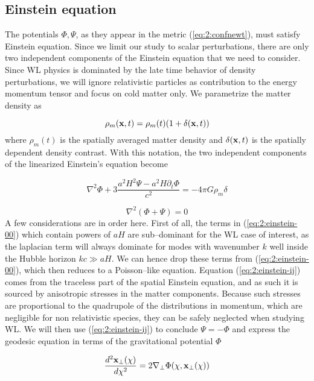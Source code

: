 \subsection{Einstein equation}
The potentials $\Phi,\Psi$, as they appear in the metric (\ref{eq:2:confnewt}), must satisfy Einstein equation. Since we limit our study to scalar perturbations, there are only two independent components of the Einstein equation that we need to consider. Since WL physics is dominated by the late time behavior of density perturbations, we will ignore relativistic particles as contribution to the energy momentum tensor and focus on cold matter only. We parametrize the matter density as 

\begin{equation}
\label{eq:2:matterrho}
\rho_m(\mathbf{x},t) = \rho_m(t)(1+\delta(\mathbf{x},t))
\end{equation}
%
where $\rho_m(t)$ is the spatially averaged matter density and $\delta(\mathbf{x},t)$ is the spatially dependent density contrast. With this notation, the two independent components of the linearized Einstein's equation become

\begin{equation}
\label{eq:2:einstein-00}
\nabla^2\Phi +3\frac{a^2H^2\Psi-a^2H\partial_t\Phi}{c^2} = -4\pi G\rho_m\delta
\end{equation}

\begin{equation}
\label{eq:2:einstein-ij}
\nabla^2(\Phi+\Psi) = 0
\end{equation}
%
A few considerations are in order here. First of all, the terms in (\ref{eq:2:einstein-00}) which contain powers of $aH$ are sub--dominant for the WL case of interest, as the laplacian term will always dominate for modes with wavenumber $k$ well inside the Hubble horizon $kc\gg aH$. We can hence drop these terms from (\ref{eq:2:einstein-00}), which then reduces to a Poisson--like equation. Equation (\ref{eq:2:einstein-ij}) comes from the traceless part of the spatial Einstein equation, and as such it is sourced by anisotropic stresses in the matter components. Because such stresses are proportional to the quadrupole of the distributions in momentum, which are negligible for non relativistic species, they can be safely neglected when studying WL. We will then use (\ref{eq:2:einstein-ij}) to conclude $\Psi=-\Phi$ and express the geodesic equation in terms of the gravitational potential $\Phi$

\begin{equation}
\label{eq:2:geodesic-fo-3}
\frac{d^2\mathbf{x}_\perp(\chi)}{d\chi^2} = 2\nabla_\perp\Phi(\chi,\mathbf{x}_\perp(\chi))
\end{equation}

